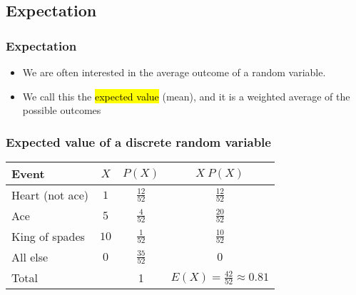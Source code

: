 \documentclass[slidestop,compress,mathserif]{beamer}
\begin{document}

\subsection{Expectation}


\begin{frame}
\frametitle{Expectation}

\begin{itemize}

\item We are often interested in the average outcome of a random variable.

\item We call this the \hl{expected value} (mean), and it is a weighted average of the possible outcomes
\formula{\[\mu = E(X) = \sum_{i = 1}^k x_i ~ P(X = x_i)\]}

\end{itemize}

\end{frame}


\begin{frame}
\frametitle{Expected value of a discrete random variable}


\begin{center}
\renewcommand{\arraystretch}{1.5}
\begin{tabular}{l | c | c | c }
Event		& $X$ 		& $P(X)$        		& $X ~ P(X)$ \\
\hline
Heart (not ace)	& $1$		& $\frac{12}{52}$	& $\frac{12}{52}$ \\
Ace			& $5$		& $\frac{4}{52}$	& $\frac{20}{52}$ \\	
King of spades	& $10$		& $\frac{1}{52}$	& $\frac{10}{52}$ \\	
All else		& $0$		& $\frac{35}{52}$	& $0$ \\
\hline
Total			&			&		1		& $E(X) = \frac{42}{52} \approx 0.81$
\end{tabular}

\end{center}

\end{frame}
\end{document}
